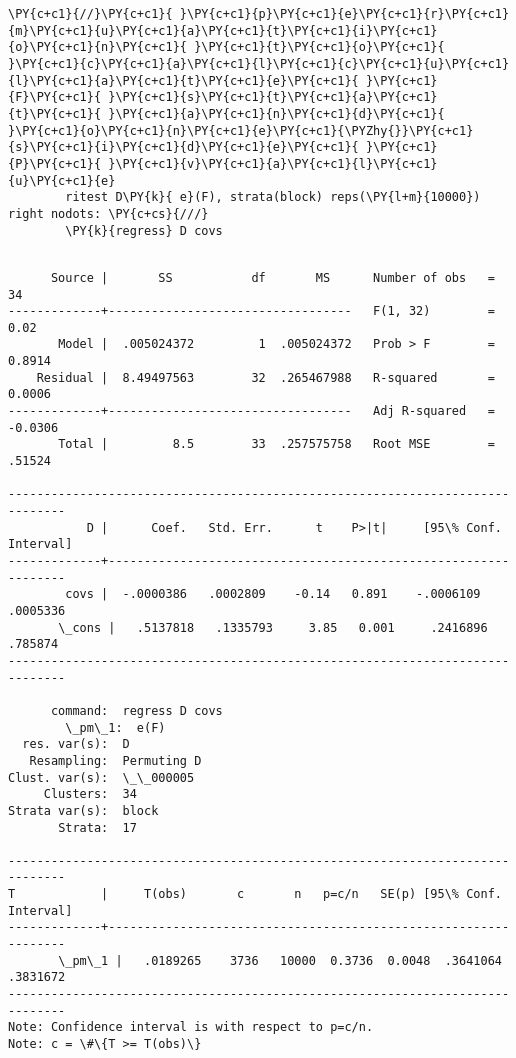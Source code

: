 \documentclass[11pt,notitlepage]{article}\usepackage[]{graphicx}\usepackage[]{color}
\makeatletter
\newenvironment{kframe}{%
 \def\at@end@of@kframe{}%
 \ifinner\ifhmode%
  \def\at@end@of@kframe{\end{minipage}}%
  \begin{minipage}{\columnwidth}%
 \fi\fi%
 \def\FrameCommand##1{\hskip\@totalleftmargin \hskip-\fboxsep
 \colorbox{shadecolor}{##1}\hskip-\fboxsep
     \hskip-\linewidth \hskip-\@totalleftmargin \hskip\columnwidth}%
 \MakeFramed {\advance\hsize-\width
   \@totalleftmargin\z@ \linewidth\hsize
   \@setminipage}}%
 {\par\unskip\endMakeFramed%
 \at@end@of@kframe}
\newenvironment{knitrout}{}{} %
\makeatother
\begin{document}
\begin{enumerate}[a)]
\begin{knitrout}
\begin{kframe}
\begin{Verbatim}[commandchars=\\\{\}]
        \PY{c+c1}{//}\PY{c+c1}{ }\PY{c+c1}{p}\PY{c+c1}{e}\PY{c+c1}{r}\PY{c+c1}{m}\PY{c+c1}{u}\PY{c+c1}{a}\PY{c+c1}{t}\PY{c+c1}{i}\PY{c+c1}{o}\PY{c+c1}{n}\PY{c+c1}{ }\PY{c+c1}{t}\PY{c+c1}{o}\PY{c+c1}{ }\PY{c+c1}{c}\PY{c+c1}{a}\PY{c+c1}{l}\PY{c+c1}{c}\PY{c+c1}{u}\PY{c+c1}{l}\PY{c+c1}{a}\PY{c+c1}{t}\PY{c+c1}{e}\PY{c+c1}{ }\PY{c+c1}{F}\PY{c+c1}{ }\PY{c+c1}{s}\PY{c+c1}{t}\PY{c+c1}{a}\PY{c+c1}{t}\PY{c+c1}{ }\PY{c+c1}{a}\PY{c+c1}{n}\PY{c+c1}{d}\PY{c+c1}{ }\PY{c+c1}{o}\PY{c+c1}{n}\PY{c+c1}{e}\PY{c+c1}{\PYZhy{}}\PY{c+c1}{s}\PY{c+c1}{i}\PY{c+c1}{d}\PY{c+c1}{e}\PY{c+c1}{ }\PY{c+c1}{P}\PY{c+c1}{ }\PY{c+c1}{v}\PY{c+c1}{a}\PY{c+c1}{l}\PY{c+c1}{u}\PY{c+c1}{e}
        ritest D\PY{k}{ e}(F), strata(block) reps(\PY{l+m}{10000}) right nodots: \PY{c+cs}{///}
        \PY{k}{regress} D covs
\end{Verbatim}

    \begin{Verbatim}[commandchars=\\\{\}]

      Source |       SS           df       MS      Number of obs   =        34
-------------+----------------------------------   F(1, 32)        =      0.02
       Model |  .005024372         1  .005024372   Prob > F        =    0.8914
    Residual |  8.49497563        32  .265467988   R-squared       =    0.0006
-------------+----------------------------------   Adj R-squared   =   -0.0306
       Total |         8.5        33  .257575758   Root MSE        =    .51524

------------------------------------------------------------------------------
           D |      Coef.   Std. Err.      t    P>|t|     [95\% Conf. Interval]
-------------+----------------------------------------------------------------
        covs |  -.0000386   .0002809    -0.14   0.891    -.0006109    .0005336
       \_cons |   .5137818   .1335793     3.85   0.001     .2416896     .785874
------------------------------------------------------------------------------

      command:  regress D covs
        \_pm\_1:  e(F)
  res. var(s):  D
   Resampling:  Permuting D
Clust. var(s):  \_\_000005
     Clusters:  34
Strata var(s):  block
       Strata:  17

------------------------------------------------------------------------------
T            |     T(obs)       c       n   p=c/n   SE(p) [95\% Conf. Interval]
-------------+----------------------------------------------------------------
       \_pm\_1 |   .0189265    3736   10000  0.3736  0.0048  .3641064   .3831672
------------------------------------------------------------------------------
Note: Confidence interval is with respect to p=c/n.
Note: c = \#\{T >= T(obs)\}




\end{Verbatim}
\end{kframe}
\end{knitrout}
\end{enumerate}
\end{document}
